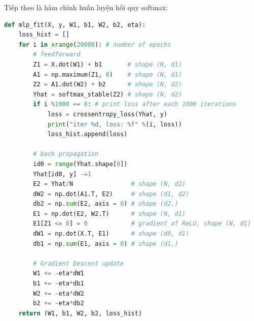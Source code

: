 Tiếp theo là hàm chính huấn luyện hồi quy softmax:
\begin{lstlisting}[language=Python]
def mlp_fit(X, y, W1, b1, W2, b2, eta):
    loss_hist = []
    for i in xrange(20000): # number of epochs 
        # feedforward 
        Z1 = X.dot(W1) + b1       # shape (N, d1)
        A1 = np.maximum(Z1, 0)    # shape (N, d1)
        Z2 = A1.dot(W2) + b2      # shape (N, d2)
        Yhat = softmax_stable(Z2) # shape (N, d2)
        if i %1000 == 0: # print loss after each 1000 iterations
            loss = crossentropy_loss(Yhat, y)
            print("iter %d, loss: %f" %(i, loss))
            loss_hist.append(loss)

        # back propagation
        id0 = range(Yhat.shape[0])
        Yhat[id0, y] -=1 
        E2 = Yhat/N                # shape (N, d2)
        dW2 = np.dot(A1.T, E2)     # shape (d1, d2)
        db2 = np.sum(E2, axis = 0) # shape (d2,)
        E1 = np.dot(E2, W2.T)      # shape (N, d1)
        E1[Z1 <= 0] = 0            # gradient of ReLU, shape (N, d1)
        dW1 = np.dot(X.T, E1)      # shape (d0, d1)
        db1 = np.sum(E1, axis = 0) # shape (d1,)

        # Gradient Descent update
        W1 += -eta*dW1
        b1 += -eta*db1
        W2 += -eta*dW2
        b2 += -eta*db2
    return (W1, b1, W2, b2, loss_hist)
\end{lstlisting}
 
